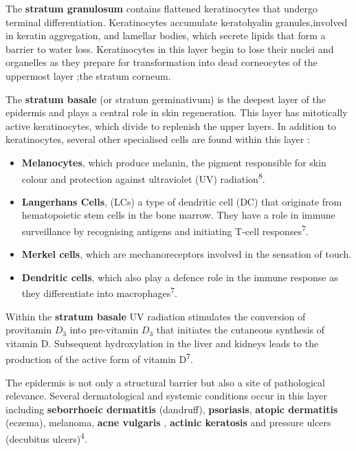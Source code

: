 \documentclass[
]{article}
\begin{document}
The \textbf{stratum granulosum} contains flattened keratinocytes that
undergo terminal differentiation. Keratinocytes accumulate keratohyalin
granules,involved in keratin aggregation, and lamellar bodies, which
secrete lipids that form a barrier to water loss. Keratinocytes in this
layer begin to lose their nuclei and organelles as they prepare for
transformation into dead corneocytes of the uppermost layer ;the stratum
corneum.

The \textbf{stratum basale} (or stratum germinativum) is the deepest
layer of the epidermis and plays a central role in skin regeneration.
This layer has mitotically active keratinocytes, which divide to
replenish the upper layers. In addition to keratinocytes, several other
specialised cells are found within this layer :

\begin{itemize}
\item
  \textbf{Melanocytes}, which produce melanin, the pigment responsible
  for skin colour and protection against ultraviolet (UV)
  radiation\textsuperscript{8}.
\item
  \textbf{Langerhans Cells}, (LCs) a type of dendritic cell (DC) that
  originate from hematopoietic stem cells in the bone marrow. They have
  a role in immune surveillance by recognising antigens and initiating
  T-cell responses\textsuperscript{7}.
\item
  \textbf{Merkel cells}, which are mechanoreceptors involved in the
  sensation of touch.
\item
  \textbf{Dendritic cells}, which also play a defence role in the immune
  response as they differentiate into macrophages\textsuperscript{7}.
\end{itemize}

Within the \textbf{stratum basale} UV radiation stimulates the
conversion of provitamin \(D_{3}\) into pre-vitamin \(D_{3}\) that
initiates the cutaneous synthesis of vitamin D. Subsequent hydroxylation
in the liver and kidneys leads to the production of the active form of
vitamin D\textsuperscript{7}.

The epidermis is not only a structural barrier but also a site of
pathological relevance. Several dermatological and systemic conditions
occur in this layer including \textbf{seborrhoeic dermatitis}
(dandruff), \textbf{psoriasis}, \textbf{atopic dermatitis} (eczema),
melanoma, \textbf{acne vulgaris }, \textbf{actinic keratosis} and
pressure ulcers (decubitus ulcers)\textsuperscript{4}.

\newpage
\end{document}
